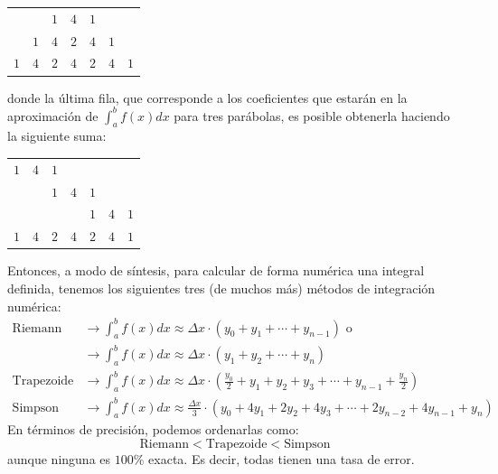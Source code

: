 \documentclass[12pt]{article}
\begin{document}
\begin{table}[hbt!]
\centering

\begin{tabular}{c c c c c c c}
 & & $1$ & $4$ & $1$ & & \\
 & $1$ & $4$ & $2$ & $4$ & $1$ & \\
$1$ & $4$ & $2$ & $4$ & $2$ & $4$ & $1$
\end{tabular}

\end{table}

donde la última fila, que corresponde a los coeficientes que estarán en la aproximación de $\int_{a}^{b} f(x)dx$ para tres parábolas, es posible obtenerla haciendo la siguiente suma:

\newpage

\begin{table}[hbt!]
\centering

\begin{tabular}{c c c c c c c}
$1$ & $4$ & $1$ & & & &  \\
 & & $1$ & $4$ & $1$ & & \\
 & & & & $1$ & $4$ & $1$\\
\hline
$1$ & $4$ & $2$ & $4$ & $2$ & $4$ & $1$
\end{tabular}

\end{table}

Entonces, a modo de síntesis, para calcular de forma numérica una integral definida, tenemos los siguientes tres (de muchos más) métodos de integración numérica:
\begin{align*}
  \text{Riemann} &\rightarrow \int_{a}^{b} f(x)dx \approx \Delta x \cdot (y_{0} + y_{1} + \cdots + y_{n - 1}) \text{ o } \\
                         &\rightarrow \int_{a}^{b} f(x)dx \approx \Delta x \cdot (y_{1} + y_{2} + \cdots + y_{n}) \\
  \text{Trapezoide} &\rightarrow \int_{a}^{b} f(x)dx \approx \Delta x \cdot
                              \left(\frac{y_{0}}{2} + y_{1} + y_{2} + y_{3} + \cdots + y_{n - 1} + \frac{y_{n}}{2}\right) \\
  \text{Simpson} &\rightarrow \int_{a}^{b} f(x)dx \approx
                          \frac{\Delta x}{3} \cdot (y_{0} + 4y_{1} + 2y_{2} + 4y_{3} + \cdots + 2y_{n - 2} + 4y_{n - 1} + y_{n})
\end{align*}
En términos de precisión, podemos ordenarlas como:
\[
  \text{Riemann} < \text{Trapezoide} < \text{Simpson}
\]
aunque ninguna es $100\%$ exacta. Es decir, todas tienen una tasa de error.
\end{document}

